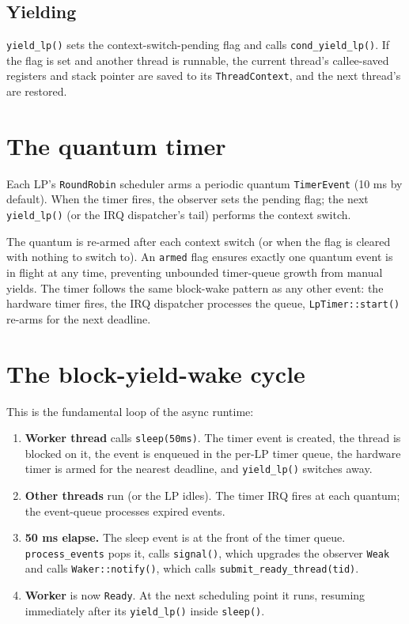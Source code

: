 \subsection{Yielding} \texttt{yield\_lp()} sets the context-switch-pending flag
and calls \texttt{cond\_yield\_lp()}. If the flag is set and another thread is
runnable, the current thread's callee-saved registers and stack pointer are
saved to its \texttt{ThreadContext}, and the next thread's are restored.

\section{The quantum timer}

Each LP's \texttt{RoundRobin} scheduler arms a periodic quantum
\texttt{TimerEvent} (10 ms by default). When the timer fires, the observer sets
the pending flag; the next \texttt{yield\_lp()} (or the IRQ dispatcher's tail)
performs the context switch.

The quantum is re-armed after each context switch (or when the flag is cleared
with nothing to switch to). An \texttt{armed} flag ensures exactly one quantum
event is in flight at any time, preventing unbounded timer-queue growth from
manual yields. The timer follows the same block-wake pattern as any other
event: the hardware timer fires, the IRQ dispatcher processes the queue,
\texttt{LpTimer::start()} re-arms for the next deadline.

\section{The block-yield-wake cycle}

This is the fundamental loop of the async runtime:

\begin{enumerate}
    \item \textbf{Worker thread} calls \texttt{sleep(50ms)}. The timer event
        is created, the thread is blocked on it, the event is enqueued in the
        per-LP timer queue, the hardware timer is armed for the nearest
        deadline, and \texttt{yield\_lp()} switches away.
    \item \textbf{Other threads} run (or the LP idles). The timer IRQ fires
        at each quantum; the event-queue processes expired events.
    \item \textbf{50 ms elapse.} The sleep event is at the front of the timer
        queue. \texttt{process\_events} pops it, calls \texttt{signal()}, which
        upgrades the observer \texttt{Weak} and calls \texttt{Waker::notify()},
        which calls \texttt{submit\_ready\_thread(tid)}.
    \item \textbf{Worker} is now \texttt{Ready}. At the next scheduling point
        it runs, resuming immediately after its \texttt{yield\_lp()} inside
        \texttt{sleep()}.
\end{enumerate}

